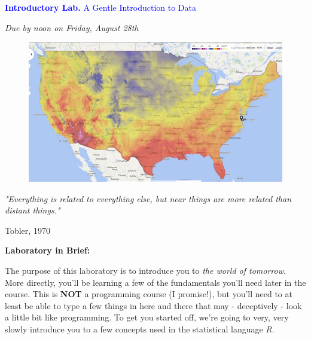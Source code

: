 \documentclass{article}
\begin{document}
\vspace*{.01mm}

\begin{center}

\Large{\textcolor{blue}{\textbf{Introductory Lab.}  A Gentle Introduction to Data}}

\vspace{4mm}

\textit{Due by noon on Friday, August 28th}\\

\end{center}

\begin{figure}[h!]
\begin{center}
\includegraphics[width=1.0\textwidth]{weather.png}

\end{center}
\end{figure}

\setlength{\parindent}{0cm}

\large{\textit{"Everything is related to everything else, but near things are more related than distant things."}
\begin{flushright}
Tobler, 1970
\end{flushright}
}




\newpage


\large{\textbf{Laboratory in Brief:}}

\vspace{4mm}

\setlength{\leftskip}{1cm}

\setlength{\parindent}{0cm}

The purpose of this laboratory is to introduce you to \textit{the world of tomorrow}.  More directly, you'll be learning a few of the fundamentals you'll need later in the course.  This is \textbf{NOT} a programming course (I promise!), but you'll need to at least be able to type a few things in here and there that may - deceptively - look a little bit like programming.  To get you started off, we're going to very, very slowly introduce you to a few concepts used in the statistical language \textit{R}.
\end{document}
